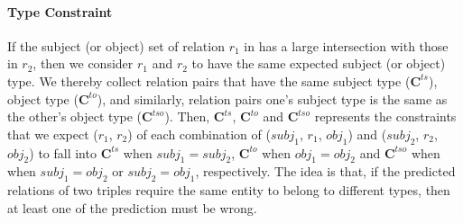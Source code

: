 \paragraph{Type Constraint}
If the subject (or object) set of relation $r_1$ in \KB has a large intersection with those in $r_2$, then we consider $r_1$ and $r_2$ to have the same expected subject (or object) type. 
We thereby collect relation pairs that have the same subject type ($\bm{C}^{ts}$), object type ($\bm{C}^{to}$), 
and similarly, relation pairs one's subject type is the same as the other's object type ($\bm{C}^{tso}$).
Then, $\bm{C}^{ts}$, $\bm{C}^{to}$ and $\bm{C}^{tso}$ represents the constraints that we expect ($r_1$, $r_2$) of each combination of ($subj_1$, $r_1$, $obj_1$) and ($subj_2$, $r_2$, $obj_2$) to fall into $\bm{C}^{ts}$ when $subj_1=subj_2$, $\bm{C}^{to}$ when $obj_1=obj_2$ and $\bm{C}^{tso}$ when when $subj_1=obj_2$ or $subj_2=obj_1$,
 respectively.
The idea is that, if the predicted relations of two triples require the same entity to belong to different types, then at least one of the prediction must be wrong.


